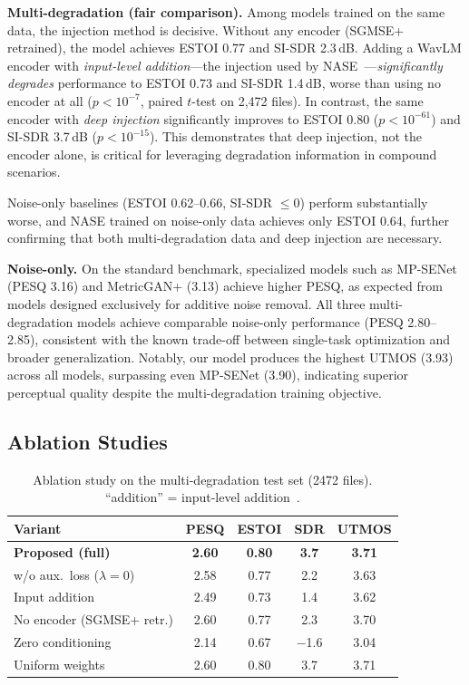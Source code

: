 \documentclass[cameraready]{Interspeech}
\begin{document}
\textbf{Multi-degradation (fair comparison).}
Among models trained on the same data, the injection method is decisive.
Without any encoder (SGMSE+ retrained), the model achieves ESTOI 0.77 and SI-SDR 2.3\,dB.
Adding a WavLM encoder with \textit{input-level addition}---the injection used by NASE~\cite{hu2023nase}---\textit{significantly degrades} performance to ESTOI 0.73 and SI-SDR 1.4\,dB, worse than using no encoder at all ($p < 10^{-7}$, paired $t$-test on 2,472 files).
In contrast, the same encoder with \textit{deep injection} significantly improves to ESTOI 0.80 ($p < 10^{-61}$) and SI-SDR 3.7\,dB ($p < 10^{-15}$).
This demonstrates that deep injection, not the encoder alone, is critical for leveraging degradation information in compound scenarios.

Noise-only baselines (ESTOI 0.62--0.66, SI-SDR $\leq$0) perform substantially worse, and NASE trained on noise-only data achieves only ESTOI 0.64, further confirming that both multi-degradation data and deep injection are necessary.

\textbf{Noise-only.}
On the standard benchmark, specialized models such as MP-SENet (PESQ 3.16) and MetricGAN+ (3.13) achieve higher PESQ, as expected from models designed exclusively for additive noise removal.
All three multi-degradation models achieve comparable noise-only performance (PESQ 2.80--2.85), consistent with the known trade-off between single-task optimization and broader generalization.
Notably, our model produces the highest UTMOS (3.93) across all models, surpassing even MP-SENet (3.90), indicating superior perceptual quality despite the multi-degradation training objective.


\subsection{Ablation Studies}
\label{sec:ablation}

\begin{table}[!t]
\centering
\caption{Ablation study on the multi-degradation test set (2472 files). ``addition'' = input-level addition~\cite{hu2023nase}.}
\label{tab:ablation}
\small
\begin{tabular}{l|cccc}
\toprule
Variant & PESQ & ESTOI & SDR & UTMOS \\
\midrule
\textbf{Proposed (full)} & \textbf{2.60} & \textbf{0.80} & \textbf{3.7} & \textbf{3.71} \\
\quad w/o aux.\ loss ($\lambda\!=\!0$) & 2.58 & 0.77 & 2.2 & 3.63 \\
\quad Input addition & 2.49 & 0.73 & 1.4 & 3.62 \\
No encoder (SGMSE+ retr.) & 2.60 & 0.77 & 2.3 & 3.70 \\
\quad Zero conditioning & 2.14 & 0.67 & $-$1.6 & 3.04 \\
\midrule
\quad Uniform weights & 2.60 & 0.80 & 3.7 & 3.71 \\
\bottomrule
\end{tabular}
\end{table}
\end{document}
